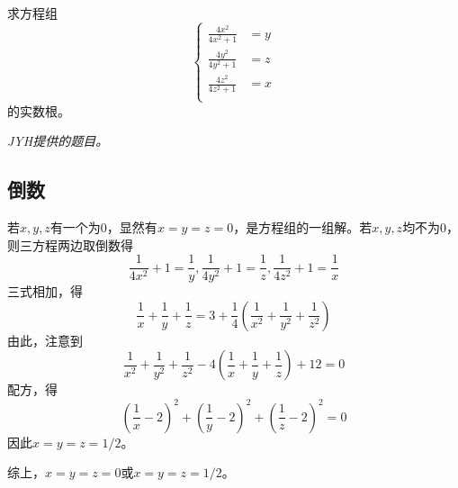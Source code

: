 

求方程组
\[ \left\{ \begin{aligned}
  \frac{4x^2}{4x^2 + 1} &= y \\
  \frac{4y^2}{4y^2 + 1} &= z \\
  \frac{4z^2}{4z^2 + 1} &= x \\
\end{aligned} \right. \]
的实数根。

\textit{JYH提供的题目。}


\subsection{倒数}

若$x, y, z$有一个为0，显然有$x = y = z = 0$，是方程组的一组解。若$x, y, z$均不为0，则三方程两边取倒数得
\[ \frac1{4x^2} + 1 = \frac1y, \frac1{4y^2} + 1 = \frac1z, \frac1{4z^2} + 1 = \frac1x \]
三式相加，得
\[ \frac1x + \frac1y + \frac1z = 3 + \frac14\left(\frac1{x^2} + \frac1{y^2} + \frac1{z^2}\right) \]
由此，注意到
\[ \frac1{x^2} + \frac1{y^2} + \frac1{z^2} - 4\left(\frac1x + \frac1y + \frac1z\right) + 12 = 0 \]
配方，得
\[ \left(\frac1x - 2\right)^2 + \left(\frac1y - 2\right)^2 + \left(\frac1z - 2\right)^2 = 0 \]
因此$x = y = z = 1/2$。

综上，$x = y = z = 0$或$x = y = z = 1/2$。
